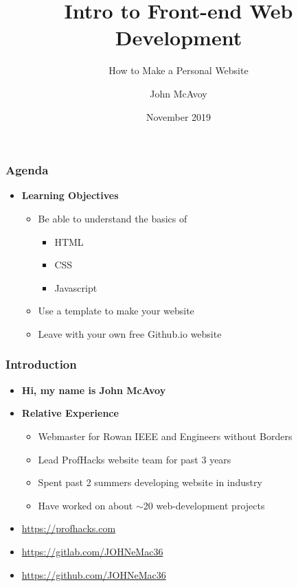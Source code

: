 \documentclass{beamer}
\title{Intro to Front-end Web Development}
\subtitle{How to Make a Personal Website}
\author{John McAvoy}
\institute{A-Team Workshop}
\date{November 2019}
\begin{document}
\frame{\titlepage}

\begin{frame}
  \frametitle{Agenda}

  \begin{itemize}
    \item \textbf{Learning Objectives}\\
      \begin{itemize}
        \item Be able to understand the basics of
          \begin{itemize}
            \item HTML
            \item CSS
            \item Javascript
          \end{itemize}
        \item Use a template to make your website
        \item Leave with your own free Github.io website
      \end{itemize}
  \end{itemize}
\end{frame}

\begin{frame}
  \frametitle{Introduction}

  \begin{itemize}
    \item \textbf{Hi, my name is John McAvoy}
    \item \textbf{Relative Experience}
      \begin{itemize}
        \item Webmaster for Rowan IEEE and Engineers without Borders
        \item Lead ProfHacks website team for past 3 years
        \item Spent past 2 summers developing website in industry
        \item Have worked on about $\sim$20 web-development projects
      \end{itemize}
  \end{itemize}

  \begin{itemize}
    \item \url{https://profhacks.com}
    \item \url{https://gitlab.com/JOHNeMac36}
    \item \url{https://github.com/JOHNeMac36}
  \end{itemize}
\end{frame}
\end{document}
